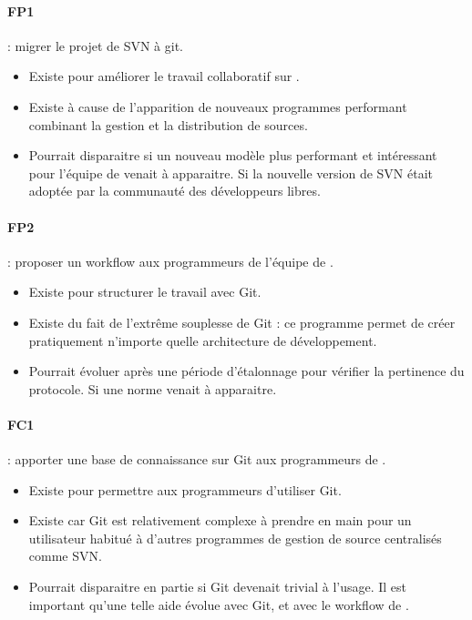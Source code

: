 \paragraph*{FP1} : migrer le projet {\gofigure} de SVN à git.
\begin{itemize}
  \item Existe pour améliorer le travail collaboratif sur {\gofigure}.
  \item Existe à cause de l'apparition de nouveaux programmes performant combinant la gestion et la distribution de sources.
  \item Pourrait disparaitre si un nouveau modèle plus performant et intéressant pour l'équipe de {\gofigure} venait à apparaitre.
  Si la nouvelle version de SVN était adoptée par la communauté des développeurs libres.
\end{itemize}

\paragraph*{FP2} : proposer un workflow aux programmeurs de l'équipe de {\gofigure}.
\begin{itemize}
  \item Existe pour structurer le travail avec Git.
  \item Existe du fait de l'extrême souplesse de Git : ce programme 
  permet de créer pratiquement n'importe quelle architecture de développement.
  \item Pourrait évoluer après une période d'étalonnage pour vérifier la pertinence du protocole.
  Si une norme venait à apparaitre.
\end{itemize}

\paragraph*{FC1} : apporter une base de connaissance sur Git aux programmeurs de {\gofigure}.
\begin{itemize}
  \item Existe pour permettre aux programmeurs d'utiliser Git.
  \item Existe car Git est relativement complexe à prendre en main 
  pour un utilisateur habitué à d'autres programmes de gestion de source centralisés comme SVN.
  \item Pourrait disparaitre en partie si Git devenait trivial à l'usage.
  Il est important qu'une telle aide évolue avec Git, et avec le workflow de {\gofigure}.
\end{itemize}

